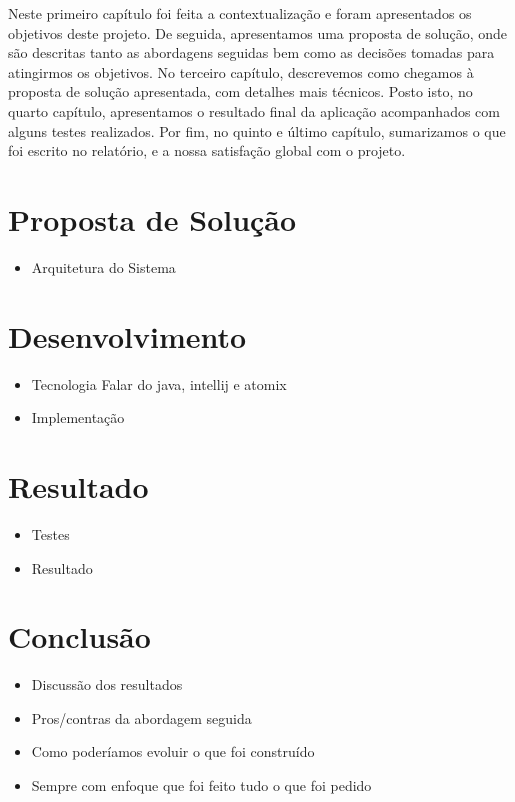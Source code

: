 \documentclass[12pt, a4paper]{report}
\begin{document}
Neste primeiro capítulo foi feita a contextualização e foram apresentados os objetivos deste projeto.
De seguida, apresentamos uma proposta de solução, onde são descritas tanto as abordagens seguidas bem como as decisões tomadas para atingirmos os objetivos.
No terceiro capítulo, descrevemos como chegamos à proposta de solução apresentada, com detalhes mais técnicos.
Posto isto, no quarto capítulo, apresentamos o resultado final da aplicação acompanhados com alguns testes realizados.
Por fim, no quinto e último capítulo, sumarizamos o que foi escrito no relatório, e a nossa satisfação global com o projeto.


\chapter{Proposta de Solução}

\begin{itemize}
    \item Arquitetura do Sistema
\end{itemize}


\chapter{Desenvolvimento}
\begin{itemize}
    \item Tecnologia
    Falar do java, intellij e atomix
    \item Implementação
    
\end{itemize}


\chapter{Resultado}
\begin{itemize}
    \item Testes
    \item Resultado
\end{itemize}


\chapter{Conclusão}
\begin{itemize}
    \item Discussão dos resultados
    \item Pros/contras da abordagem seguida
    \item Como poderíamos evoluir o que foi construído
    \item Sempre com enfoque que foi feito tudo o que foi pedido
\end{itemize}
\end{document}
